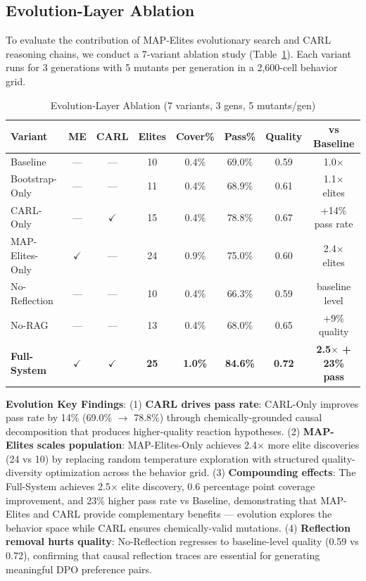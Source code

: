\documentclass{article}
\begin{document}
\subsection{Evolution-Layer Ablation}

To evaluate the contribution of MAP-Elites evolutionary search and CARL reasoning chains, we conduct a 7-variant ablation study (Table~\ref{tab:evolution_ablation}). Each variant runs for 3 generations with 5 mutants per generation in a 2,600-cell behavior grid.

\begin{table}[h]
\centering
\caption{Evolution-Layer Ablation (7 variants, 3 gens, 5 mutants/gen)}
\label{tab:evolution_ablation}
\begin{tabular}{lccccccc}
\toprule
\textbf{Variant} & \textbf{ME} & \textbf{CARL} & \textbf{Elites} & \textbf{Cover\%} & \textbf{Pass\%} & \textbf{Quality} & \textbf{vs Baseline} \\
\midrule
Baseline & — & — & 10 & 0.4\% & 69.0\% & 0.59 & 1.0$\times$ \\
Bootstrap-Only & — & — & 11 & 0.4\% & 68.9\% & 0.61 & 1.1$\times$ elites \\
CARL-Only & — & $\checkmark$ & 15 & 0.4\% & 78.8\% & 0.67 & +14\% pass rate \\
MAP-Elites-Only & $\checkmark$ & — & 24 & 0.9\% & 75.0\% & 0.60 & 2.4$\times$ elites \\
No-Reflection & — & — & 10 & 0.4\% & 66.3\% & 0.59 & baseline level \\
No-RAG & — & — & 13 & 0.4\% & 68.0\% & 0.65 & +9\% quality \\
\textbf{Full-System} & $\checkmark$ & $\checkmark$ & \textbf{25} & \textbf{1.0\%} & \textbf{84.6\%} & \textbf{0.72} & \textbf{2.5$\times$ + 23\% pass} \\
\bottomrule
\end{tabular}
\end{table}

\textbf{Evolution Key Findings}: (1) \textbf{CARL drives pass rate}: CARL-Only improves pass rate by 14\% (69.0\% $\rightarrow$ 78.8\%) through chemically-grounded causal decomposition that produces higher-quality reaction hypotheses. (2) \textbf{MAP-Elites scales population}: MAP-Elites-Only achieves 2.4$\times$ more elite discoveries (24 vs 10) by replacing random temperature exploration with structured quality-diversity optimization across the behavior grid. (3) \textbf{Compounding effects}: The Full-System achieves 2.5$\times$ elite discovery, 0.6 percentage point coverage improvement, and 23\% higher pass rate vs Baseline, demonstrating that MAP-Elites and CARL provide complementary benefits — evolution explores the behavior space while CARL ensures chemically-valid mutations. (4) \textbf{Reflection removal hurts quality}: No-Reflection regresses to baseline-level quality (0.59 vs 0.72), confirming that causal reflection traces are essential for generating meaningful DPO preference pairs.
\end{document}
